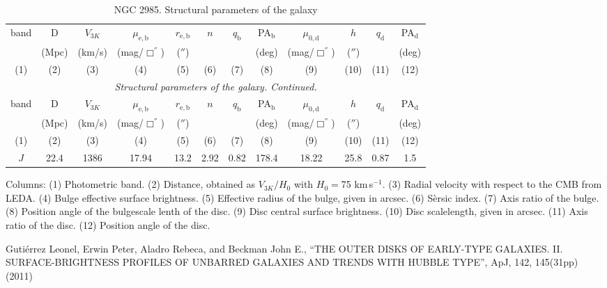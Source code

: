 \documentclass[english,10pt]{article}
\def\mm{\mathrm}
\begin{document}
\begin{longtable}[c]{cccccccccccc}
\caption{NGC 2985. Structural parameters of the galaxy} \\ 
\hline 
band & D & $V_{3K}$ & 
$\mu_\mm{e,b}$ & $r_\mm{e,b}$ & $n$ & $q_\mm{b}$ & PA$_\mm{b}$ & 
$\mu_\mm{0,d}$ & $h$ & $q_\mm{d}$ & PA$_\mm{d}$ \\ 
& (Mpc) & (km/s) & 
(mag/$\Box^{''}$) & ($''$) & & & (deg) & 
(mag/$\Box^{''}$) & ($''$) & & (deg) \\
(1)&(2)&(3)&(4)&(5)&(6)&(7)&(8)&(9)&(10)&(11)&(12) \\ 
\hline
\endfirsthead 
\hline
\multicolumn{12}{c}{\small\slshape Structural parameters of the galaxy. 
Continued. } \\ \hline
band & D & $V_{3K}$ & 
$\mu_\mm{e,b}$ & $r_\mm{e,b}$ & $n$ & $q_\mm{b}$ & PA$_\mm{b}$ & 
$\mu_\mm{0,d}$ & $h$ & $q_\mm{d}$ & PA$_\mm{d}$ \\ 
& (Mpc) & (km/s) & 
(mag/$\Box^{''}$) & ($''$) & & & (deg) & 
(mag/$\Box^{''}$) & ($''$) & & (deg) \\
(1)&(2)&(3)&(4)&(5)&(6)&(7)&(8)&(9)&(10)&(11)&(12) \\
\hline
\endhead 
\hline
$J$ & 22.4 & 1386 &
17.94 & 13.2 & 2.92 & 0.82 & 178.4 & 
18.22 & 25.8 & 0.87 & 1.5 \tabularnewline
\hline
\end{longtable}

Columns: 
(1) Photometric band. 
(2) Distance, obtained as $V_{3K}/H_0$ with $H_0=$75 km\,s$^{-1}$.
(3) Radial velocity with respect to the CMB from LEDA.
(4) Bulge effective surface brightness. 
(5) Effective radius of the bulge, given in arcsec.
(6) S\`ersic index. 
(7) Axis ratio of the bulge.
(8) Position angle of the bulgescale lenth of the disc.
(9) Disc central surface brightness. 
(10) Disc scalelength, given in arcsec.
(11) Axis ratio of the disc.
(12) Position angle of the disc. 

\newpage
\noindent
Guti\'{e}rrez Leonel, Erwin Peter, Aladro Rebeca, and 
Beckman John E., 
``THE OUTER DISKS OF EARLY-TYPE GALAXIES. 
II. SURFACE-BRIGHTNESS PROFILES OF UNBARRED GALAXIES AND TRENDS 
WITH HUBBLE TYPE'', 
ApJ, 142, 145(31pp) (2011)
\end{document}
